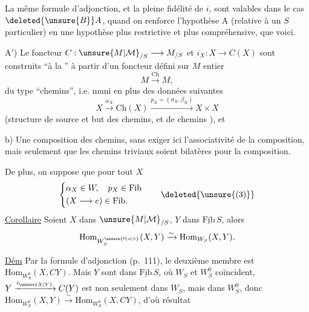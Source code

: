 La même formule d'adjonction, et la
pleine fidélité de $i$, sont valables dans le cas $\deleted{\unsure{B}}A$, quand on renforce l'hypothèse A (relative à un $S$ particulier) en une hypothèse plus restrictive et plus compréhensive, que voici.

A$'$) Le foncteur $C:\unsure{M|\mathcal M}_{/S}\longrightarrow M_{/S}$ et     $i_X:X\longrightarrow C(X)$ sont construits ``à la '' à partir d'un foncteur défini sur $M$  entier
\[
M\xrightarrow{\mathrm{Ch}}M,
\]
du type ``chemins'', i.e. muni en plus des données suivantes
\[
X\xrightarrow{\alpha_X}\mathrm{Ch}(X)\xrightarrow{p_X=(\sigma_X,\beta_X)}X\times X\tag*{a)}
\]
(structure de source et but des chemins, et de chemins ), et

b) Une composition des chemins, sans exiger ici l'associativité de la composition, mais seulement que les chemins triviaux soient  bilatères pour la composition.

De plus, on suppose que pour tout $X$
\[
\left\{\begin{aligned}
&\alpha_X\in W,\quad p_X\in\mathrm{Fib}\\
&(X\longrightarrow e)\in\mathrm{Fib}.
\end{aligned}\right.\tag*{\deleted{\unsure{(3)}}}
\]
\uline{Corollaire} Soient $X$ dans $\unsure{M|\mathcal M}_{/S}$, $Y$ dans $\underline{\mathrm{Fib}}\,S$, alors
\[
\mathrm{Hom}_{W_S^{\unsure{0|o|\circ}}}(X,Y)\xrightarrow{\sim}\mathrm{Hom}_{W_S}(X,Y).
\]

\uline{Dém} Par la formule d'adjonction (p.~111), le deuxième membre est \deleted{\unsure{$\simeq$}} $\mathrm{Hom}_{W_S^0}(X,CY)$. Mais  $Y$  sont dans $\underline{\mathrm{Fib}}\,S$, où $W_S$ et $W_S^0$ coïncident, $Y\xrightarrow{i_{\unsure{X|Y}}}C(Y)$ est non seulement dans $W_S$, mais dans $W_S^0$, donc $\mathrm{Hom}_{W_S^0}(X,Y)\xrightarrow{\sim}\mathrm{Hom}_{W_S^0}(X,CY)$, d'où  résultat 


